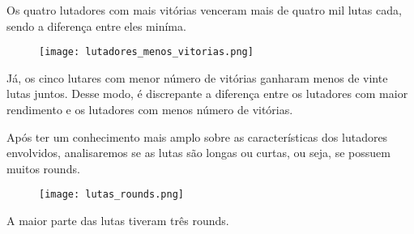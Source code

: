 \documentclass{article}
\begin{document}
\par Os quatro lutadores com mais vitórias venceram mais de quatro mil lutas cada, sendo a diferença entre eles miníma. 

\begin{figure}[H] 
    \centering 
    \texttt{[image: lutadores\_menos\_vitorias.png]} 
\end{figure}

\par Já, os cinco lutares com menor número de vitórias ganharam menos de vinte lutas juntos. Desse modo, é discrepante a diferença entre os lutadores com maior rendimento e os lutadores com menos número de vitórias.
\par Após ter um conhecimento mais amplo sobre as características dos lutadores envolvidos, analisaremos se as lutas são longas ou curtas, ou seja, se possuem muitos rounds.

\begin{figure}[H] 
    \centering 
    \texttt{[image: lutas\_rounds.png]} 
\end{figure}

\par A maior parte das lutas tiveram três rounds. 
\end{document}
